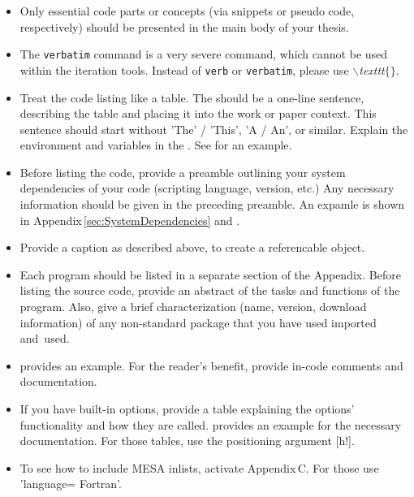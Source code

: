 \noindent
{}
\begin{itemize}
    \item Only essential code parts or concepts (via snippets or pseudo code, respectively) should be presented in the main body of your thesis. 
    
    \item The \texttt{verbatim} command is a very severe command, which cannot be used within the iteration tools. Instead of \texttt{verb} or \texttt{verbatim}, please use \textit{$\backslash$texttt$\{\}$}.
    
    \item Treat the code listing like a table. The   should be a one-line sentence, describing the table and placing it into the work or paper context. This sentence should start without 'The' / 'This', 'A / An', or similar. Explain the environment and variables in the . See  for an example.
\end{itemize}

\noindent
{}
\begin{itemize}

    \item Before listing the code, provide a preamble outlining your system dependencies of your code (scripting language, version, etc.) Any necessary information should be given in the preceding preamble.
    An expamle is shown in Appendix\,\ref{sec:SystemDependencies} and .
    
    \item Provide a caption as described above, to create a referencable object.
    
    \item Each program should be listed in a separate section of the Appendix. Before listing the source code, provide an abstract of the tasks and functions of the program. Also, give a brief characterization (name, version, download information) of any non-standard package that you have used imported and~used. 
    
    \item {} provides an example. For the reader's benefit, provide in-code comments and documentation.%
    
    \item If you have built-in options, provide a table explaining the options' functionality and how they are called.  provides an example for the necessary documentation. For those tables, use the positioning argument [h!].
    
    \item To see how to include MESA inlists, activate Appendix\,C. For those use 'language= Fortran'.
\end{itemize}


